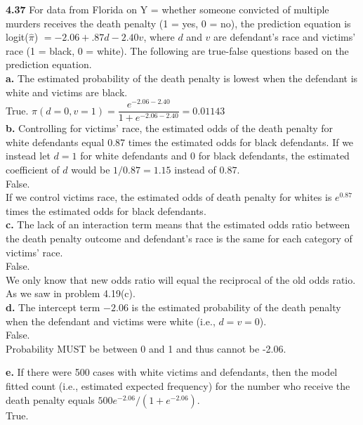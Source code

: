 \documentclass[paper=letter, fontsize=11pt]{scrartcl} %
\begin{document}
\textbf{4.37} For data from Florida on Y = whether someone convicted of multiple murders
receives the death penalty (1 = yes, 0 = no), the prediction equation is
logit($\hat{\pi}$) $= −2.06 + .87d − 2.40v$, where $d$ and $v$ are defendant's race and
victims' race (1 = black, 0 = white). The following are true-false questions
based on the prediction equation. \\

\textbf{a.} The estimated probability of the death penalty is lowest when the defendant
is white and victims are black. \\

True.
$\pi(d = 0, v = 1) = \dfrac{e^{-2.06-2.40}}{1+e^{-2.06-2.40}} = 0.01143$
\\
\textbf{b.} Controlling for victims' race, the estimated odds of the death penalty for
white defendants equal 0.87 times the estimated odds for black defendants.
If we instead let $d = 1$ for white defendants and 0 for black defendants, the
estimated coefficient of $d$ would be $1/0.87 = 1.15$ instead of $0.87$. \\

False. \\
If we control victims race, the estimated odds of death penalty for whites is 
$e^{0.87}$ times the estimated odds for black defendants.
\\

\textbf{c.} The lack of an interaction term means that the estimated odds ratio between
the death penalty outcome and defendant's race is the same for each category
of victims' race. \\

False. \\
We only know that new odds ratio will equal the reciprocal of the old odds ratio. As we 
saw in problem 4.19(c).
\\

\textbf{d.} The intercept term $−2.06$ is the estimated probability of the death penalty
when the defendant and victims were white (i.e., $d = v = 0$). \\

False. \\
Probability MUST be between 0 and 1 and thus cannot be -2.06.

\textbf{e.} If there were 500 cases with white victims and defendants, then the model
fitted count (i.e., estimated expected frequency) for the number who receive
the death penalty equals $500e^{−2.06}/(1 + e^{−2.06})$. \\

True. \\
\end{document}
